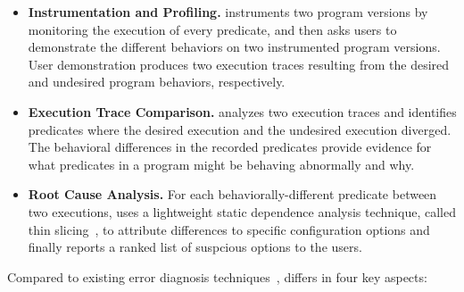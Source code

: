 \begin{itemize}

\item \textbf{Instrumentation and Profiling.} \ourtool
instruments two program versions by monitoring the
execution of every predicate, and then asks users to
demonstrate the different behaviors on two instrumented
program versions. User demonstration produces two execution
traces resulting from the desired and undesired program
behaviors, respectively.

\item \textbf{Execution Trace Comparison.}
\ourtool analyzes two execution traces and identifies 
predicates where the desired execution and the undesired
execution diverged. The behavioral differences in
the recorded predicates provide evidence for what
predicates in a program might be behaving abnormally
and why.

\item \textbf{Root Cause Analysis.} For each behaviorally-different
predicate between two executions, \ourtool 
 uses a lightweight static dependence analysis
technique, called thin slicing~\cite{}, to attribute
differences to specific configuration options and
finally reports a ranked list of suspcious options to the users.


\end{itemize}

Compared to existing error diagnosis
techniques~\cite{}, \ourtool differs in four
key aspects:

